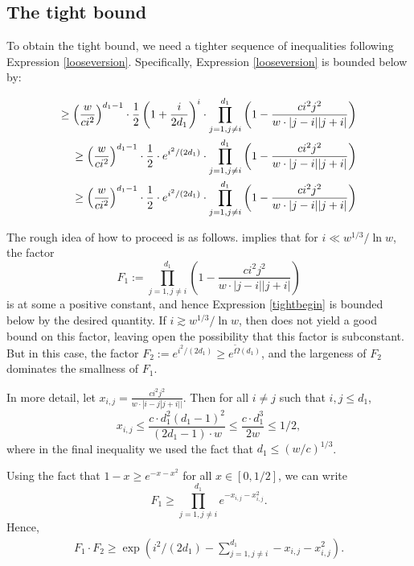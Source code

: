 \documentclass[10pt,a4paper]{article}
\newcommand{\<}{\langle}
\renewcommand{\>}{\rangle}
\begin{document}
%
\subsection{The tight bound}

\label{tightsec} To obtain the tight bound, we need a tighter sequence of
inequalities following Expression \eqref{looseversion}. Specifically,
Expression \eqref{looseversion} is bounded below by:

\begin{align}
\geq \left(\frac{w}{ci^2}\right)^{d_1-1} \cdot \frac{1}{2} \left(1+ \frac{i}{
2d_1}\right)^i \cdot \prod_{j=1, j \neq i}^{d_1} \left(1-\frac{c i^2 j^2}{w
\cdot |j-i| |j+i|}\right)  \notag \\
\geq \left(\frac{w}{ci^2}\right)^{d_1-1} \cdot \frac{1}{2} \cdot
e^{i^2/(2d_1)} \cdot \prod_{j=1, j \neq i}^{d_1} \left(1-\frac{c i^2 j^2}{w
\cdot |j-i| |j+i|}\right)  \notag \\
\geq \left(\frac{w}{ci^2}\right)^{d_1-1} \cdot \frac{1}{2} \cdot
e^{i^2/(2d_1)} \cdot \prod_{j=1, j \neq i}^{d_1} \left(1-\frac{c i^2 j^2}{w
\cdot |j-i| |j+i|}\right)  \label{tightbegin}
\end{align}

The rough idea of how to proceed is as follows. 
implies that for $i \ll w^{1/3}/\ln w$, the factor
\begin{equation*}
F_1 := \prod_{j=1, j \neq i}^{d_1} \left(1-\frac{c i^2 j^2}{w \cdot |j-i|
|j+i|}\right)
\end{equation*}
is at some a positive constant, and hence Expression \eqref{tightbegin} is
bounded below by the desired quantity. If $i \gtrsim w^{1/3}/\ln w$, then
 does not yield a good bound on this factor, leaving
open the possibility that this factor is subconstant. But in this case, the
factor $F_2:= e^{i^2/(2d_1)} \geq e^{\tilde{\Omega}(d_1)}$, and the
largeness of $F_2$ dominates the smallness of $F_1$.

In more detail, let $x_{i, j} = \frac{ci^2j^2}{w \cdot |i-j| j+i||}$. Then
for all $i \neq j$ such that $i, j \leq d_1$,
\begin{equation}  \label{xijbound}
x_{i,j} \leq \frac{c \cdot d_1^2 (d_1-1)^2}{(2d_1-1) \cdot w} \leq \frac{c
\cdot d_1^3}{2w} \leq 1/2,
\end{equation}
where in the final inequality we used the fact that $d_1 \leq (w/c)^{1/3}$.

Using the fact that $1-x \geq e^{-x-x^2}$ for all $x \in [0, 1/2]$, we can
write
\begin{equation*}
F_1 \geq \prod_{j=1, j\neq i}^{d_1} e^{-x_{i,j} - x_{i, j}^2}.
\end{equation*}
Hence,
\begin{align*}
F_1 \cdot F_2 \geq \exp\left(i^2/(2d_1) - \sum_{j=1, j\neq i}^{d_1} -x_{i,j}
- x_{i, j}^2\right).
\end{align*}
\end{document}
